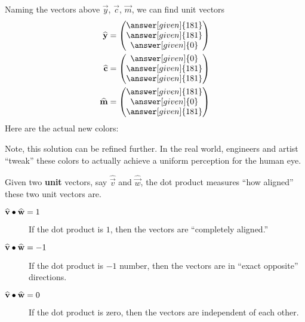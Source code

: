 \documentclass{ximera}
\begin{document}
\begin{example}
\begin{explanation}
\[   \]
   Naming the vectors above $\vec{y}$, $\vec{c}$, $\vec{m}$, we can find unit vectors
   \begin{align*}
     \hat{\vec y} &= \begin{pmatrix}\answer[given]{181}\\\answer[given]{181}\\\answer[given]{0}\end{pmatrix}\\
     \hat{\vec c} &= \begin{pmatrix}\answer[given]{0}\\\answer[given]{181}\\\answer[given]{181}\end{pmatrix}\\
     \hat{\vec m} &= \begin{pmatrix}\answer[given]{181}\\\answer[given]{0}\\\answer[given]{181}\end{pmatrix}
   \end{align*}
    Here are the actual new colors:
    \begin{center}
    \end{center}
    Note, this solution can be refined further. In the real world,
    engineers and artist ``tweak'' these colors to actually achieve a
    uniform perception for the human eye.
  \end{explanation}
\end{example}




Given two \textbf{unit} vectors, say $\hat{\vec v}$ and $\hat{\vec w}$, the dot
product measures ``how aligned'' these two unit vectors are.
\begin{description}
  \item[$\widehat{\mathbf{v}}\bullet \widehat{\mathbf{w}} = 1$] If the dot product is $1$, then the vectors are ``completely
    aligned.''
  \item[$\widehat{\mathbf{v}}\bullet \widehat{\mathbf{w}} = -1$] If the dot
    product is $-1$ number, then the vectors are in ``exact opposite''
    directions.
  \item[$\widehat{\mathbf{v}}\bullet \widehat{\mathbf{w}} = 0$]If the dot
    product is zero, then the vectors are independent of each other.
\end{description}
\end{document}
